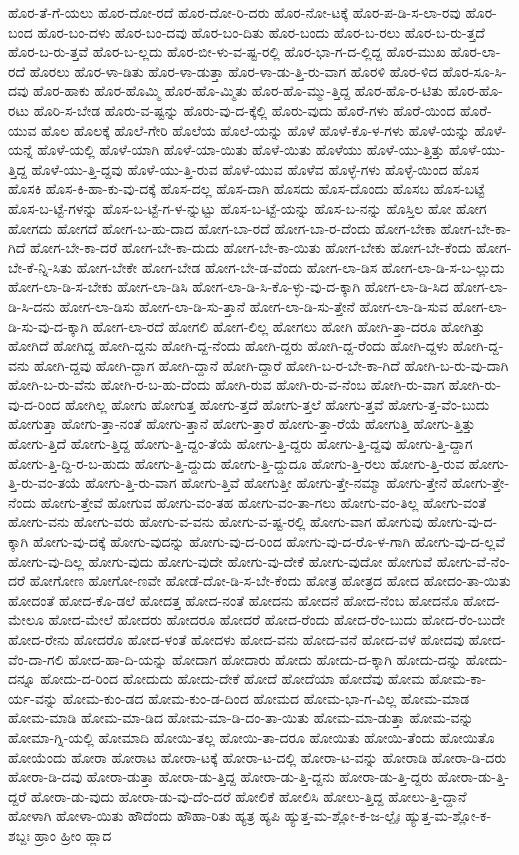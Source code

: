 {ಹೊರ-ತೆ-ಗೆ-ಯಲು
ಹೊರ-ದೋ-ರದೆ
ಹೊರ-ದೋ-ರಿ-ದರು
ಹೊರ-ನೋ-ಟಕ್ಕೆ
ಹೊರ-ಪ-ಡಿ-ಸ-ಲಾ-ರವು
ಹೊರ-ಬಂದ
ಹೊರ-ಬಂ-ದಳು
ಹೊರ-ಬಂ-ದವು
ಹೊರ-ಬಂ-ದಿತು
ಹೊರ-ಬಂದು
ಹೊರ-ಬ-ರಲು
ಹೊರ-ಬ-ರು-ತ್ತದೆ
ಹೊರ-ಬ-ರು-ತ್ತವೆ
ಹೊರ-ಬ-ಲ್ಲದು
ಹೊರ-ಬೀ-ಳು-ವ-ಷ್ಟ-ರಲ್ಲಿ
ಹೊರ-ಭಾ-ಗ-ದ-ಲ್ಲಿದ್ದ
ಹೊರ-ಮುಖ
ಹೊರ-ಲಾ-ರದೆ
ಹೊರಲು
ಹೊರ-ಳಾ-ಡಿತು
ಹೊರ-ಳಾ-ಡುತ್ತಾ
ಹೊರ-ಳಾ-ಡು-ತ್ತಿ-ರು-ವಾಗ
ಹೊರಳಿ
ಹೊರ-ಳಿದ
ಹೊರ-ಸೂ-ಸಿ-ದವು
ಹೊರ-ಹಾಕು
ಹೊರ-ಹೊಮ್ಮಿ
ಹೊರ-ಹೊ-ಮ್ಮಿತು
ಹೊರ-ಹೊ-ಮ್ಮು-ತ್ತಿದ್ದ
ಹೊರ-ಹೊ-ರ-ಟಿತು
ಹೊರ-ಹೊ-ರಟು
ಹೊರಿ-ಸ-ಬೇಡ
ಹೊರು-ವ-ಷ್ಟನ್ನು
ಹೊರು-ವು-ದ-ಕ್ಕೆಲ್ಲಿ
ಹೊರು-ವುದು
ಹೊರೆ-ಗಳು
ಹೊರೆ-ಯಿಂದ
ಹೊರೆ-ಯುವ
ಹೊಲ
ಹೊಲಕ್ಕೆ
ಹೊಲೆ-ಗೇರಿ
ಹೊಲೆಯ
ಹೊಲೆ-ಯನ್ನು
ಹೊಳೆ
ಹೊಳೆ-ಕೊ-ಳ-ಗಳು
ಹೊಳೆ-ಯನ್ನು
ಹೊಳೆ-ಯನ್ನೆ
ಹೊಳೆ-ಯಲ್ಲಿ
ಹೊಳೆ-ಯಾಗಿ
ಹೊಳೆ-ಯಾ-ಯಿತು
ಹೊಳೆ-ಯಿತು
ಹೊಳೆಯು
ಹೊಳೆ-ಯು-ತ್ತಿತ್ತು
ಹೊಳೆ-ಯು-ತ್ತಿದ್ದ
ಹೊಳೆ-ಯು-ತ್ತಿ-ದ್ದವು
ಹೊಳೆ-ಯು-ತ್ತಿ-ರುವ
ಹೊಳೆ-ಯುವ
ಹೊಳೆವ
ಹೊಳ್ಳೆ-ಗಳು
ಹೊಳ್ಳೆ-ಯಿಂದ
ಹೊಸ
ಹೊಸಕಿ
ಹೊಸ-ಕಿ-ಹಾ-ಕು-ವು-ದಕ್ಕೆ
ಹೊಸ-ದಲ್ಲ
ಹೊಸ-ದಾಗಿ
ಹೊಸದು
ಹೊಸ-ದೊಂದು
ಹೊಸಬ
ಹೊಸ-ಬಟ್ಟೆ
ಹೊಸ-ಬ-ಟ್ಟೆ-ಗಳನ್ನು
ಹೊಸ-ಬ-ಟ್ಟೆ-ಗ-ಳ-ನ್ನುಟ್ಟು
ಹೊಸ-ಬ-ಟ್ಟೆ-ಯನ್ನು
ಹೊಸ-ಬ-ನನ್ನು
ಹೊಸ್ತಿಲ
ಹೋ
ಹೋಗ
ಹೋಗದು
ಹೋಗದೆ
ಹೋಗ-ಬ-ಹು-ದಾದ
ಹೋಗ-ಬಾ-ರದೆ
ಹೋಗ-ಬಾ-ರ-ದೆಂದು
ಹೋಗ-ಬೇಕಾ
ಹೋಗ-ಬೇ-ಕಾ-ಗಿದೆ
ಹೋಗ-ಬೇ-ಕಾ-ದರೆ
ಹೋಗ-ಬೇ-ಕಾ-ದುದು
ಹೋಗ-ಬೇ-ಕಾ-ಯಿತು
ಹೋಗ-ಬೇಕು
ಹೋಗ-ಬೇ-ಕೆಂದು
ಹೋಗ-ಬೇ-ಕೆ-ನ್ನಿ-ಸಿತು
ಹೋಗ-ಬೇಕೇ
ಹೋಗ-ಬೇಡ
ಹೋಗ-ಬೇ-ಡ-ವೆಂದು
ಹೋಗ-ಲಾ-ಡಿಸ
ಹೋಗ-ಲಾ-ಡಿ-ಸ-ಬ-ಲ್ಲುದು
ಹೋಗ-ಲಾ-ಡಿ-ಸ-ಬೇಕು
ಹೋಗ-ಲಾ-ಡಿಸಿ
ಹೋಗ-ಲಾ-ಡಿ-ಸಿ-ಕೊ-ಳ್ಳು-ವು-ದ-ಕ್ಕಾಗಿ
ಹೋಗ-ಲಾ-ಡಿ-ಸಿದ
ಹೋಗ-ಲಾ-ಡಿ-ಸಿ-ದನು
ಹೋಗ-ಲಾ-ಡಿಸು
ಹೋಗ-ಲಾ-ಡಿ-ಸು-ತ್ತಾನೆ
ಹೋಗ-ಲಾ-ಡಿ-ಸು-ತ್ತೇನೆ
ಹೋಗ-ಲಾ-ಡಿ-ಸುವ
ಹೋಗ-ಲಾ-ಡಿ-ಸು-ವು-ದ-ಕ್ಕಾಗಿ
ಹೋಗ-ಲಾ-ರದೆ
ಹೋಗಲಿ
ಹೋಗ-ಲಿಲ್ಲ
ಹೋಗಲು
ಹೋಗಿ
ಹೋಗಿ-ತ್ತಾ-ದರೂ
ಹೋಗಿತ್ತು
ಹೋಗಿದೆ
ಹೋಗಿದ್ದ
ಹೋಗಿ-ದ್ದನು
ಹೋಗಿ-ದ್ದ-ನೆಂದು
ಹೋಗಿ-ದ್ದರು
ಹೋಗಿ-ದ್ದ-ರೆಂದು
ಹೋಗಿ-ದ್ದಳು
ಹೋಗಿ-ದ್ದ-ವನು
ಹೋಗಿ-ದ್ದವು
ಹೋಗಿ-ದ್ದಾಗ
ಹೋಗಿ-ದ್ದಾನೆ
ಹೋಗಿ-ದ್ದಾರೆ
ಹೋಗಿ-ಬ-ರ-ಬೇ-ಕಾ-ಗಿದೆ
ಹೋಗಿ-ಬ-ರು-ವು-ದಾಗಿ
ಹೋಗಿ-ಬ-ರು-ವೆನು
ಹೋಗಿ-ರ-ಬ-ಹು-ದೆಂದು
ಹೋಗಿ-ರುವ
ಹೋಗಿ-ರು-ವ-ನೆಂಬ
ಹೋಗಿ-ರು-ವಾಗ
ಹೋಗಿ-ರು-ವು-ದ-ರಿಂದ
ಹೋಗಿಲ್ಲ
ಹೋಗು
ಹೋಗುತ್ತ
ಹೋಗು-ತ್ತದೆ
ಹೋಗು-ತ್ತಲೆ
ಹೋಗು-ತ್ತವೆ
ಹೋಗು-ತ್ತ-ವೆಂ-ಬುದು
ಹೋಗುತ್ತಾ
ಹೋಗು-ತ್ತಾ-ನಂತೆ
ಹೋಗು-ತ್ತಾನೆ
ಹೋಗು-ತ್ತಾರೆ
ಹೋಗು-ತ್ತಾ-ರೆಯೆ
ಹೋಗುತ್ತಿ
ಹೋಗು-ತ್ತಿತ್ತು
ಹೋಗು-ತ್ತಿದೆ
ಹೋಗು-ತ್ತಿದ್ದ
ಹೋಗು-ತ್ತಿ-ದ್ದಂ-ತೆಯೆ
ಹೋಗು-ತ್ತಿ-ದ್ದರು
ಹೋಗು-ತ್ತಿ-ದ್ದವು
ಹೋಗು-ತ್ತಿ-ದ್ದಾಗ
ಹೋಗು-ತ್ತಿ-ದ್ದಿ-ರ-ಬ-ಹುದು
ಹೋಗು-ತ್ತಿ-ದ್ದುದು
ಹೋಗು-ತ್ತಿ-ದ್ದುದೂ
ಹೋಗು-ತ್ತಿ-ರಲು
ಹೋಗು-ತ್ತಿ-ರುವ
ಹೋಗು-ತ್ತಿ-ರು-ವಂ-ತಯೆ
ಹೋಗು-ತ್ತಿ-ರು-ವಾಗ
ಹೋಗು-ತ್ತಿವೆ
ಹೋಗುತ್ತೀ
ಹೋಗು-ತ್ತೇ-ನಮ್ಮಾ
ಹೋಗು-ತ್ತೇನೆ
ಹೋಗು-ತ್ತೇ-ನೆಂದು
ಹೋಗು-ತ್ತೇವೆ
ಹೋಗುವ
ಹೋಗು-ವಂ-ತಹ
ಹೋಗು-ವಂ-ತಾ-ಗಲು
ಹೋಗು-ವಂ-ತಿಲ್ಲ
ಹೋಗು-ವಂತೆ
ಹೋಗು-ವನು
ಹೋಗು-ವರು
ಹೋಗು-ವ-ವನು
ಹೋಗು-ವ-ಷ್ಟ-ರಲ್ಲಿ
ಹೋಗು-ವಾಗ
ಹೋಗುವು
ಹೋಗು-ವು-ದ-ಕ್ಕಾಗಿ
ಹೋಗು-ವು-ದಕ್ಕೆ
ಹೋಗು-ವುದನ್ನು
ಹೋಗು-ವು-ದ-ರಿಂದ
ಹೋಗು-ವು-ದ-ರೊ-ಳ-ಗಾಗಿ
ಹೋಗು-ವು-ದ-ಲ್ಲವೆ
ಹೋಗು-ವು-ದಿಲ್ಲ
ಹೋಗು-ವುದು
ಹೋಗು-ವುದೇ
ಹೋಗು-ವು-ದೇಕೆ
ಹೋಗು-ವುದೋ
ಹೋಗುವೆ
ಹೋಗು-ವೆ-ನೆಂ-ದರೆ
ಹೋಗೋಣ
ಹೋಗೋ-ಣವೇ
ಹೋಡೆ-ದೋ-ಡಿ-ಸ-ಬೇ-ಕೆಂದು
ಹೋತ್ರ
ಹೋತ್ರದ
ಹೋದ
ಹೋದಂ-ತಾ-ಯಿತು
ಹೋದಂತೆ
ಹೋದ-ಕೊ-ಡಲೆ
ಹೋದತ್ತ
ಹೋದ-ನಂತೆ
ಹೋದನು
ಹೋದನೆ
ಹೋದ-ನೆಂಬ
ಹೋದನೊ
ಹೋದ-ಮೇಲೂ
ಹೋದ-ಮೇಲೆ
ಹೋದರು
ಹೋದರೂ
ಹೋದರೆ
ಹೋದ-ರೆಂದು
ಹೋದ-ರೆಂ-ಬುದು
ಹೋದ-ರೆಂ-ಬುದೇ
ಹೋದ-ರೇನು
ಹೋದರೊ
ಹೋದ-ಳಂತೆ
ಹೋದಳು
ಹೋದ-ವನು
ಹೋದ-ವನೆ
ಹೋದ-ವಳೆ
ಹೋದವು
ಹೋದ-ವೆಂ-ದಾ-ಗಲಿ
ಹೋದ-ಹಾ-ದಿ-ಯನ್ನು
ಹೋದಾಗ
ಹೋದಾರು
ಹೋದು
ಹೋದು-ದ-ಕ್ಕಾಗಿ
ಹೋದು-ದನ್ನು
ಹೋದು-ದನ್ನೂ
ಹೋದು-ದ-ರಿಂದ
ಹೋದುದು
ಹೋದು-ದೇಕೆ
ಹೋದೆ
ಹೋದೆಯಾ
ಹೋದೆವು
ಹೋಮ
ಹೋಮ-ಕಾ-ರ್ಯ-ವನ್ನು
ಹೋಮ-ಕುಂ-ಡದ
ಹೋಮ-ಕುಂ-ಡ-ದಿಂದ
ಹೋಮದ
ಹೋಮ-ಭಾ-ಗ-ವಿಲ್ಲ
ಹೋಮ-ಮಾಡ
ಹೋಮ-ಮಾಡಿ
ಹೋಮ-ಮಾ-ಡಿದ
ಹೋಮ-ಮಾ-ಡಿ-ದಂ-ತಾ-ಯಿತು
ಹೋಮ-ಮಾ-ಡುತ್ತಾ
ಹೋಮ-ವನ್ನು
ಹೋಮಾ-ಗ್ನಿ-ಯಲ್ಲಿ
ಹೋಮಾದಿ
ಹೋಯಿ-ತಲ್ಲ
ಹೋಯಿ-ತಾ-ದರೂ
ಹೋಯಿತು
ಹೋಯಿ-ತೆಂದು
ಹೋಯಿತೊ
ಹೋಯೆಂದು
ಹೋರಾ
ಹೋರಾಟ
ಹೋರಾ-ಟಕ್ಕೆ
ಹೋರಾ-ಟ-ದಲ್ಲಿ
ಹೋರಾ-ಟ-ವನ್ನು
ಹೋರಾಡಿ
ಹೋರಾ-ಡಿ-ದರು
ಹೋರಾ-ಡಿ-ದವು
ಹೋರಾ-ಡುತ್ತಾ
ಹೋರಾ-ಡು-ತ್ತಿದ್ದ
ಹೋರಾ-ಡು-ತ್ತಿ-ದ್ದನು
ಹೋರಾ-ಡು-ತ್ತಿ-ದ್ದರು
ಹೋರಾ-ಡು-ತ್ತಿ-ದ್ದರೆ
ಹೋರಾ-ಡು-ವುದು
ಹೋರಾ-ಡು-ವು-ದೆಂ-ದರೆ
ಹೋಲಿಕೆ
ಹೋಲಿಸಿ
ಹೋಲು-ತ್ತಿದ್ದ
ಹೋಲು-ತ್ತಿ-ದ್ದಾನೆ
ಹೋಳಾಗಿ
ಹೋಳಾ-ಯಿತು
ಹೌದೆಂದು
ಹೌಹಾ-ರಿತು
ಹ್ಯತ್ರ
ಹ್ಯಪಿ
ಹ್ಯುತ್ತ-ಮ-ಶ್ಲೋ-ಕ-ಜ-ಲ್ಪೈಃ
ಹ್ಯುತ್ತ-ಮ-ಶ್ಲೋ-ಕ-ಶಬ್ದಃ
ಹ್ರಾಂ
ಹ್ರೀಂ
ಹ್ಲಾದ
}
